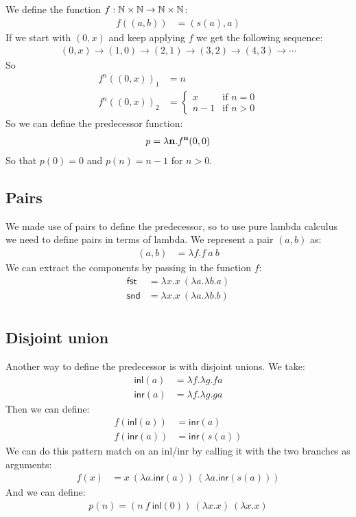 We define the function $f : \mathbb{N} \times \mathbb{N} \to \mathbb{N} \times \mathbb{N}$:
\begin{align*}
  f((a,b)) &= (s(a),a)
\end{align*}
If we start with $(0,x)$ and keep applying $f$ we get the following sequence:
\begin{align*}
  (0,x) \to (1,0) \to (2,1) \to (3,2) \to (4,3) \to \cdots
\end{align*}
So
\begin{align*}
  f^n((0,x))_1 &= n\\
  f^n((0,x))_2 &= \begin{cases}
    x & \text{if } n=0 \\
    n-1 & \text{if } n > 0
  \end{cases}
\end{align*}
So we can define the predecessor function:
\begin{align*}
  p = \lambda \mathbf{n}. f^{\mathbf{n}}(0,0)
\end{align*}
So that $p(0) = 0$ and $p(n) = n-1$ for $n>0$.

\subsection{Pairs}

We made use of pairs to define the predecessor, so to use pure lambda calculus we need to define pairs in terms of lambda. We represent a pair $(a,b)$ as:
\begin{align*}
  (a,b) &= \lambda f. f\ a\ b
\end{align*}
We can extract the components by passing in the function $f$:
\begin{align*}
  \mathsf{fst} &= \lambda x. x\ (\lambda a. \lambda b. a)\\
  \mathsf{snd} &= \lambda x. x\ (\lambda a. \lambda b. b)\\
\end{align*}

\subsection{Disjoint union}

Another way to define the predecessor is with disjoint unions. We take:
\begin{align*}
  \mathsf{inl}(a) &= \lambda f. \lambda g. f a \\
  \mathsf{inr}(a) &= \lambda f. \lambda g. g a
\end{align*}
Then we can define:
\begin{align*}
  f(\mathsf{inl}(a)) &= \mathsf{inr}(a)\\
  f(\mathsf{inr}(a)) &= \mathsf{inr}(s(a))
\end{align*}
We can do this pattern match on an inl/inr by calling it with the two branches as arguments:
\begin{align*}
  f(x) &= x\ (\lambda a. \mathsf{inr}(a))\ (\lambda a.\mathsf{inr}(s(a)))
\end{align*}
And we can define:
\begin{align*}
  p(n) = (n\ f\ \mathsf{inl}(0))\ (\lambda x. x)\ (\lambda x. x)
\end{align*}

